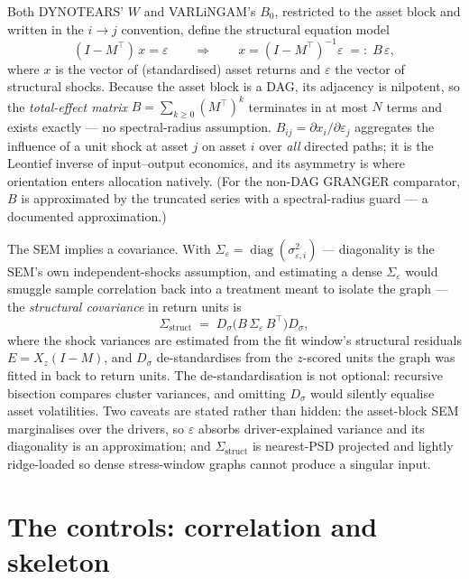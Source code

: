 Both DYNOTEARS' $W$ and VARLiNGAM's $B_0$, restricted to the asset block and
written in the $i\to j$ convention, define the structural equation model
\begin{equation}
  (I - M^\top)\, x = \varepsilon
  \qquad\Longrightarrow\qquad
  x = (I - M^\top)^{-1} \varepsilon \;=:\; B\,\varepsilon,
  \label{eq:sem}
\end{equation}
where $x$ is the vector of (standardised) asset returns and $\varepsilon$ the
vector of structural shocks. Because the asset block is a DAG, its adjacency
is nilpotent, so the \emph{total-effect matrix}
$B = \sum_{k\ge 0} (M^\top)^k$ terminates in at most $N$ terms and exists
exactly --- no spectral-radius assumption. $B_{ij} = \partial x_i / \partial
\varepsilon_j$ aggregates the influence of a unit shock at asset $j$ on asset
$i$ over \emph{all} directed paths; it is the Leontief inverse of
input--output economics, and its asymmetry is where orientation enters
allocation natively. (For the non-DAG GRANGER comparator, $B$ is approximated
by the truncated series with a spectral-radius guard --- a documented
approximation.)

The SEM implies a covariance. With $\Sigma_\varepsilon =
\operatorname{diag}(\sigma^2_{\varepsilon,i})$ --- diagonality is the SEM's
own independent-shocks assumption, and estimating a dense
$\Sigma_\varepsilon$ would smuggle sample correlation back into a treatment
meant to isolate the graph --- the \emph{structural covariance} in return
units is
\begin{equation}
  \Sigma_{\mathrm{struct}}
  \;=\; D_\sigma \big( B\, \Sigma_\varepsilon\, B^\top \big) D_\sigma ,
  \label{eq:sigma-struct}
\end{equation}
where the shock variances are estimated from the fit window's structural
residuals $E = X_z (I - M)$, and $D_\sigma$ de-standardises from the
$z$-scored units the graph was fitted in back to return units. The
de-standardisation is not optional: recursive bisection compares cluster
variances, and omitting $D_\sigma$ would silently equalise asset
volatilities. Two caveats are stated rather than hidden: the asset-block SEM
marginalises over the drivers, so $\varepsilon$ absorbs driver-explained
variance and its diagonality is an approximation; and
$\Sigma_{\mathrm{struct}}$ is nearest-PSD projected and lightly ridge-loaded
so dense stress-window graphs cannot produce a singular input.

\section{The controls: correlation and skeleton}
\label{sec:controls}


